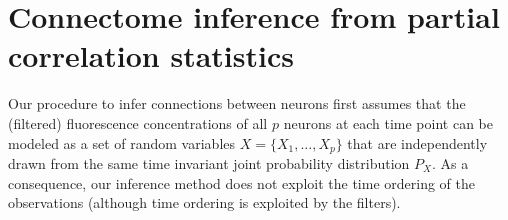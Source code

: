 \documentclass[wcp]{jmlr}
\begin{document}
\section{Connectome inference from partial correlation statistics}
\label{sec:inference}


Our procedure to infer connections between neurons first assumes that
the (filtered) fluorescence concentrations of all $p$ neurons at each
time point can be modeled as a set of random variables $X = \{X_1,
\dots, X_p\}$ that are independently drawn from the same time invariant
joint probability distribution $P_X$. %
As a consequence, our inference method does not exploit the time
ordering of the observations (although time ordering is exploited by
the filters).

\end{document}

